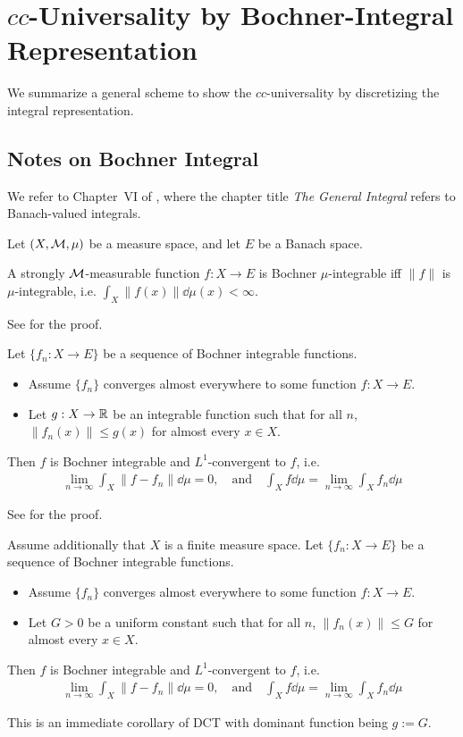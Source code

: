 \section{$cc$-Universality by Bochner-Integral Representation} \label{sec:bochner-cc}
We summarize a general scheme to show the $cc$-universality by discretizing the integral representation.

\subsection{Notes on Bochner Integral}
We refer to Chapter~VI of \citet{Lang1993}, where the chapter title \emph{The General Integral} refers to Banach-valued integrals.

Let $(X,\mathcal{M},\mu)$ be a measure space,
and let $E$ be a Banach space.
\begin{lemma}
    A strongly $\mathcal{M}$-measurable function $f:X\to E$ is Bochner $\mu$-integrable iff $\| f \|$ is $\mu$-integrable, i.e. $\int_X \| f(x) \| \dd\mu(x) < \infty$.
\end{lemma}
See \citet[Theorem~1, V.5][]{Yosida.new} for the proof.

\begin{lemma} \label{lem:dct}
Let $\{f_n:X\to E\}$ be a sequence of Bochner integrable functions. \begin{itemize}
    \item Assume $\{f_n\}$ converges almost everywhere to some function $f:X\to E$.
    \item Let $g:X\to\mathbb{R}$ be an integrable function such that for all $n$, $\|f_n(x)\| \le g(x)$ for almost every $x \in X$.
\end{itemize}
 Then $f$ is Bochner integrable and $L^1$-convergent to $f$, i.e.
\begin{align*}
\lim_{n \to \infty} \int_X \| f - f_n \| \dd \mu = 0, \quad \mbox{and} \quad
    \int_X f \dd\mu = \lim_{n\to\infty} \int_X f_n \dd\mu
\end{align*}
\end{lemma}
See \citet[Theorem~5.8, VI, \S~5][]{Lang1993} for the proof.

\begin{lemma} \label{lem:bct}
Assume additionally that $X$ is a finite measure space.
Let $\{f_n:X\to E\}$ be a sequence of Bochner integrable functions. \begin{itemize}
    \item Assume $\{f_n\}$ converges almost everywhere to some function $f:X\to E$.
    \item Let $G>0$ be a uniform constant such that for all $n$, $\| f_n(x) \| \le G$ for almost every $x \in X$.
\end{itemize}
 Then $f$ is Bochner integrable and $L^1$-convergent to $f$, i.e.
\begin{align*}
\lim_{n \to \infty} \int_X \| f - f_n \| \dd \mu = 0, \quad \mbox{and} \quad
    \int_X f \dd\mu = \lim_{n\to\infty} \int_X f_n \dd\mu
\end{align*}
\end{lemma}
This is an immediate corollary of DCT with dominant function being $g := G$.

